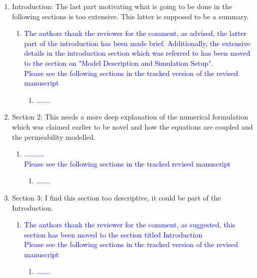 \documentclass[11pt]{letter} %
\newcommand{\blue}{\textcolor{blue}}
\begin{document}
\begin{letter}
{\begin{enumerate}
\begin{enumerate}
\begin{enumerate}
\begin{enumerate}
   \end{enumerate}
        \end{enumerate}
\item \label{R_R2_TooMuchSum} Introduction: The last part motivating what is going to be done in the following sections is too extensive. This latter is supposed to be a summary.
   \begin{enumerate}
   \item \label{R_R2_TooMuchSum_1} \blue{The authors thank the reviewer for the comment, as advised, the latter part of the introduction has been made brief. Additionally, the extensive details in the introduction section which was referred to has been moved to the section on "Model Description and Simulation Setup".}\\
     \blue{Please see the following sections in the tracked version of the revised manuscript}
   \begin{enumerate}
 \item \blue{.......}
   \end{enumerate}
        \end{enumerate}
\item \label{R_R2_NumFormulation} Section 2: This needs a more deep explanation of the numerical formulation which was claimed earlier to be novel and how the equations are coupled and the permeability modelled.
   \begin{enumerate}
   \item \label{R_R2_NumFormulation_1} \blue{..........}\\
     \blue{Please see the following sections in the tracked revised manuscript}
   \begin{enumerate}
 \item \blue{.......}
   \end{enumerate}
        \end{enumerate}
\item \label{R_R2_TooDesc} Section 3: I find this section too descriptive, it could be part of the Introduction.
 \begin{enumerate}
 \item \label{R_R2_TooDesc_1} \blue{The authors thank the reviewer for the comment, as suggested, this section has been moved to the section titled Introduction}\\
   \blue{Please see the following sections in the tracked version of the revised manuscript}
   \begin{enumerate}
 \item \blue{.......}
   \end{enumerate}

\end{enumerate}
\end{enumerate}
\end{enumerate}}
\end{letter}
\end{document}
